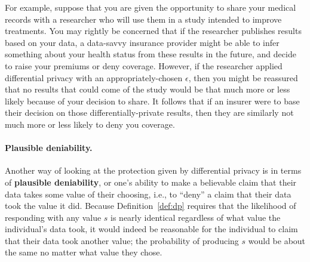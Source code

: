 \documentclass[11pt,twoside]{scrartcl}
\begin{document}
For example, suppose that you are given the opportunity to share your medical records with a researcher who will use them in a study intended to improve treatments. You may rightly be concerned that if the researcher publishes results based on your data, a data-savvy insurance provider might be able to infer something about your health status from these results in the future, and decide to raise your premiums or deny coverage. However, if the researcher applied differential privacy with an appropriately-chosen $\epsilon$, then you might be reassured that no results that could come of the study would be that much more or less likely because of your decision to share. It follows that if an insurer were to base their decision on those differentially-private results, then they are similarly not much more or less likely to deny you coverage.

\paragraph{Plausible deniability.} Another way of looking at the protection given by differential privacy is in terms of \textbf{plausible deniability}, or one's ability to make a believable claim that their data takes some value of their choosing, i.e., to ``deny'' a claim that their data took the value it did. Because Definition~\ref{def:dp} requires that the likelihood of \san responding with any value $s$ is nearly identical regardless of what value the individual's data took, it would indeed be reasonable for the individual to claim that their data took another value; the probability of producing $s$ would be about the same no matter what value they chose.
\end{document}
